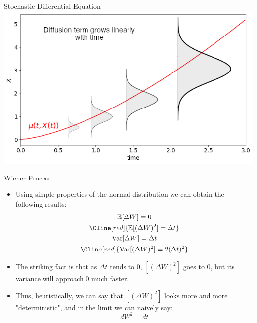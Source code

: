 \documentclass{beamer}
\begin{document}
\begin{frame}{Stochastic Differential Equation}
\includegraphics[width=0.7\linewidth]{images/brownian_process.png}
\end{frame}

\begin{frame}{Wiener Process}
	\begin{itemize}
		\item Using simple properties of the normal distribution we can obtain the following results:
			\begin{equation*}
				\begin{gathered}
					\mathbb{E}[\Delta W] = 0 \\
					\Cline[red]{\mathbb{E}[(\Delta W)^2] = \Delta t} \\
					\text{Var}[\Delta W] = \Delta t \\
					\Cline[red]{\text{Var}[(\Delta W)^2] = 2(\Delta t)^2} \\
				\end{gathered}
			\end{equation*}
		\item The striking fact is that as $\Delta t$ tends to 0, $[(\Delta W)^2]$ goes to 0, but its variance will approach 0 much faster.
		\item Thus, heuristically, we can say that $[(\Delta W)^2]$ looks more and more "deterministic", and in the limit we can naively say:
		\begin{equation*}
		\boxed{dW^2 = dt}
		\end{equation*}
	\end{itemize}
\end{frame}
\end{document}

